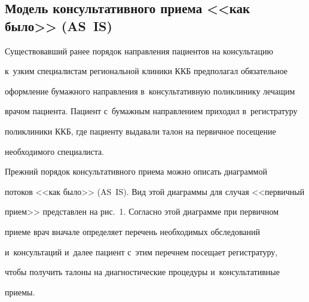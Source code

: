 \subsection{Модель консультативного приема <<как было>> (AS~IS)}





   Существовавший ранее порядок направления пациентов на консультацию 


к~узким специалистам региональной клиники ККБ предполагал обязательное 


оформление бумажного направления в~консультативную поликлинику лечащим 


врачом пациента. Пациент с~бумажным направлением приходил в~регистратуру 


поликлиники ККБ, где пациенту выдавали талон на первичное посещение 


необходимого специалиста.


  


  Прежний порядок консультативного приема можно описать диаграммой 


потоков <<как было>> (AS~IS). Вид этой диаграммы для случая <<первичный 


прием>> представлен на рис.~1. Согласно этой диаграмме при первичном 


приеме врач вначале определяет перечень необходимых обследований 


и~консультаций и~далее пациент с~этим перечнем посещает регистратуру, 


чтобы получить талоны на диагностические процедуры и~консультативные 


приемы. 


  


